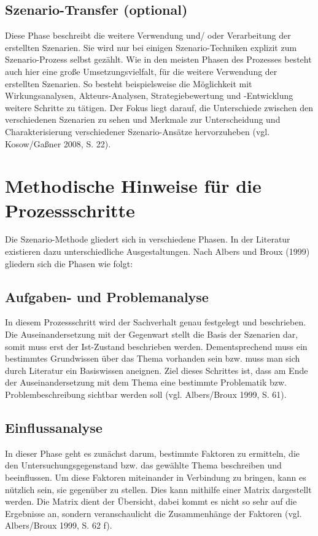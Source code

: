 \documentclass[12pt,a4paper]{article}
\begin{document}
\subsection{Szenario-Transfer (optional)} 
Diese Phase beschreibt die weitere Verwendung und/ oder Verarbeitung der erstellten Szenarien. Sie wird nur bei einigen Szenario-Techniken explizit zum Szenario-Prozess selbst gezählt. Wie in den meisten Phasen des Prozesses besteht auch hier eine große Umsetzungsvielfalt, für die weitere Verwendung der erstellten Szenarien. So besteht beispielsweise die Möglichkeit mit Wirkungsanalysen, Akteurs-Analysen, Strategiebewertung und -Entwicklung weitere Schritte zu tätigen. Der Fokus liegt darauf, die Unterschiede zwischen den verschiedenen Szenarien zu sehen und Merkmale zur Unterscheidung und Charakterisierung verschiedener Szenario-Ansätze hervorzuheben (vgl. Kosow/Gaßner 2008, S. 22). 

\section{Methodische Hinweise für die Prozessschritte}
Die Szenario-Methode gliedert sich in verschiedene Phasen. In der Literatur existieren dazu unterschiedliche Ausgestaltungen. Nach Albers und Broux (1999)\cite{Albers1999} gliedern sich die Phasen wie folgt: 

\subsection{Aufgaben- und Problemanalyse} 
In diesem Prozessschritt wird der Sachverhalt genau festgelegt und beschrieben. Die Auseinandersetzung mit der Gegenwart stellt die Basis der Szenarien dar, somit muss erst der Ist-Zustand beschrieben werden. Dementsprechend muss ein bestimmtes Grundwissen über das Thema vorhanden sein bzw. muss man sich durch Literatur ein Basiswissen aneignen. Ziel dieses Schrittes ist, dass am Ende der Auseinandersetzung mit dem Thema eine bestimmte Problematik bzw. Problembeschreibung sichtbar werden soll (vgl. Albers/Broux 1999, S. 61). 

\subsection{Einflussanalyse} 
In dieser Phase geht es zunächst darum, bestimmte Faktoren zu ermitteln, die den Untersuchungsgegenstand bzw. das gewählte Thema beschreiben und beeinflussen. Um diese Faktoren miteinander in Verbindung zu bringen, kann es nützlich sein, sie gegenüber zu stellen. Dies kann mithilfe einer Matrix dargestellt werden. Die Matrix dient der Übersicht, dabei kommt es nicht so sehr auf die Ergebnisse an, sondern veranschaulicht die Zusammenhänge der Faktoren (vgl. Albers/Broux 1999, S. 62 f). 
\end{document}
